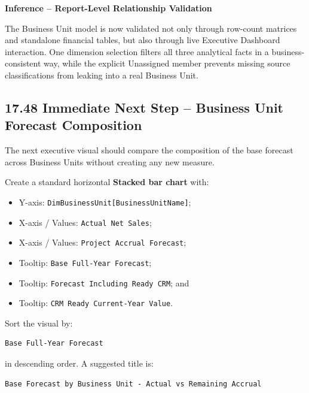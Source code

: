 \documentclass[11pt,a4paper]{article}
\begin{document}
\begin{inferencebox}

\textbf{Inference -- Report-Level Relationship Validation}

The Business Unit model is now validated not only through row-count matrices and
standalone financial tables, but also through live Executive Dashboard
interaction. One dimension selection filters all three analytical facts in a
business-consistent way, while the explicit Unassigned member prevents missing
source classifications from leaking into a real Business Unit.

\end{inferencebox}


\subsection{17.48 Immediate Next Step -- Business Unit Forecast Composition}

The next executive visual should compare the composition of the base forecast
across Business Units without creating any new measure.

Create a standard horizontal \textbf{Stacked bar chart} with:

\begin{itemize}[leftmargin=7mm,itemsep=2pt]
    \item Y-axis: \texttt{DimBusinessUnit[BusinessUnitName]};
    \item X-axis / Values: \texttt{Actual Net Sales};
    \item X-axis / Values: \texttt{Project Accrual Forecast};
    \item Tooltip: \texttt{Base Full-Year Forecast};
    \item Tooltip: \texttt{Forecast Including Ready CRM}; and
    \item Tooltip: \texttt{CRM Ready Current-Year Value}.
\end{itemize}

Sort the visual by:

\begin{lstlisting}[style=powerquery]
Base Full-Year Forecast
\end{lstlisting}

in descending order. A suggested title is:

\begin{lstlisting}[style=powerquery]
Base Forecast by Business Unit - Actual vs Remaining Accrual
\end{lstlisting}
\end{document}
